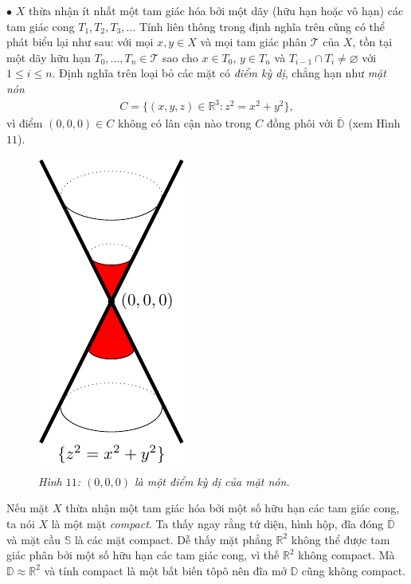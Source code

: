 \begin{multicols}{2}
	\vskip 0.1cm
	$\bullet$ $X$ thừa nhận ít nhất một tam giác hóa bởi một dãy (hữu hạn hoặc vô hạn) các tam giác cong $T_1,T_2,T_3,\ldots$
	\vskip 0.1cm
	Tính liên thông trong định nghĩa trên cũng có thể phát biểu lại như sau: với mọi $x,y \in X$ và mọi tam giác phân $\mathscr{T}$ của $X$, tồn tại một dãy hữu hạn $T_0,\ldots,T_n \in \mathscr{T}$ sao cho $x \in T_0$, $y \in T_n$ và $T_{i-1} \cap T_i \neq \varnothing$ với $1 \le i \le n$. 
	\vskip 0.1cm
	Định nghĩa trên loại bỏ các mặt có {\it điểm kỳ dị}, chẳng hạn như {\it mặt nón}
	\begin{align*}
		C = \{(x,y,z) \in \mathbb{R}^3: z^2 = x^2 + y^2\},
	\end{align*}
	vì điểm $(0,0,0) \in C$ không có lân cận nào trong $C$ đồng phôi với $\overline{\mathbb{D}}$ (xem Hình $11$).
	\begin{figure}[H]
		\vspace*{-5pt}
		\centering\captionsetup{labelformat=empty, justification=centering}
		\includegraphics[width=0.35\linewidth]{H11.pdf}
		\caption{\small\textit{\color{duongvaotoanhoc}Hình $11$: $(0,0,0)$ là một điểm kỳ dị của mặt nón.}}
		\vspace*{-10pt}
	\end{figure}
	Nếu mặt $X$ thừa nhận một tam giác hóa bởi một số hữu hạn các tam giác cong, ta nói $X$ là một mặt {\it compact}. Ta thấy ngay rằng tứ diện, hình hộp, đĩa đóng $\overline{\mathbb{D}}$ và mặt cầu $\mathbb{S}$ là các mặt compact. Dễ thấy mặt phẳng $\mathbb{R}^2$ không thể được tam giác phân bởi một số hữu hạn các tam giác cong, vì thế $\mathbb{R}^2$ không compact. Mà $\mathbb{D} \approx \mathbb{R}^2$ và tính compact là một bất biến tôpô nên đĩa mở $\mathbb{D}$ cũng không compact.

\end{multicols}
